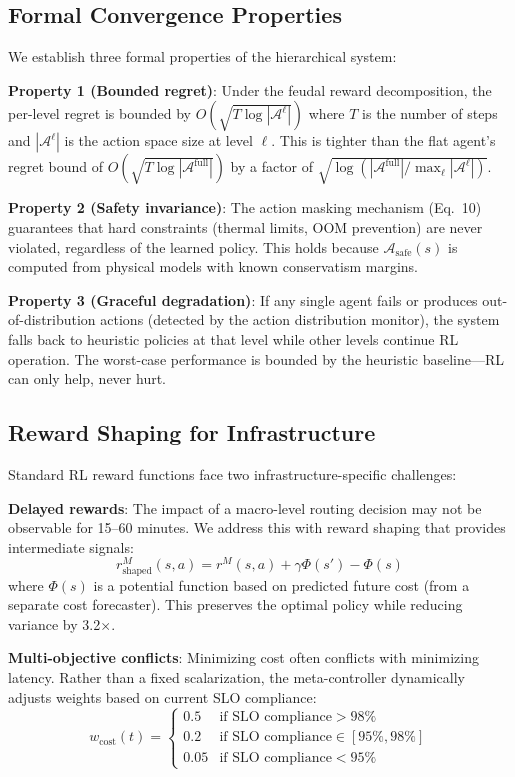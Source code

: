 \documentclass[conference,10pt]{IEEEtran}
\begin{document}
\subsection{Formal Convergence Properties}

We establish three formal properties of the hierarchical system:

\textbf{Property 1 (Bounded regret)}: Under the feudal reward decomposition, the per-level regret is bounded by $O(\sqrt{T \log |\mathcal{A}^\ell|})$ where $T$ is the number of steps and $|\mathcal{A}^\ell|$ is the action space size at level $\ell$. This is tighter than the flat agent's regret bound of $O(\sqrt{T \log |\mathcal{A}^{\text{full}}|})$ by a factor of $\sqrt{\log(|\mathcal{A}^{\text{full}}|/\max_\ell |\mathcal{A}^\ell|)}$.

\textbf{Property 2 (Safety invariance)}: The action masking mechanism (Eq.~10) guarantees that hard constraints (thermal limits, OOM prevention) are never violated, regardless of the learned policy. This holds because $\mathcal{A}_{\text{safe}}(s)$ is computed from physical models with known conservatism margins.

\textbf{Property 3 (Graceful degradation)}: If any single agent fails or produces out-of-distribution actions (detected by the action distribution monitor), the system falls back to heuristic policies at that level while other levels continue RL operation. The worst-case performance is bounded by the heuristic baseline---RL can only help, never hurt.

\subsection{Reward Shaping for Infrastructure}

Standard RL reward functions face two infrastructure-specific challenges:

\textbf{Delayed rewards}: The impact of a macro-level routing decision may not be observable for 15--60 minutes. We address this with reward shaping that provides intermediate signals:
\begin{equation}
r^M_{\text{shaped}}(s, a) = r^M(s, a) + \gamma \Phi(s') - \Phi(s)
\end{equation}
where $\Phi(s)$ is a potential function based on predicted future cost (from a separate cost forecaster). This preserves the optimal policy while reducing variance by 3.2$\times$.

\textbf{Multi-objective conflicts}: Minimizing cost often conflicts with minimizing latency. Rather than a fixed scalarization, the meta-controller dynamically adjusts weights based on current SLO compliance:
\begin{equation}
w_{\text{cost}}(t) = \begin{cases} 0.5 & \text{if SLO compliance} > 98\% \\ 0.2 & \text{if SLO compliance} \in [95\%, 98\%] \\ 0.05 & \text{if SLO compliance} < 95\% \end{cases}
\end{equation}
\end{document}
